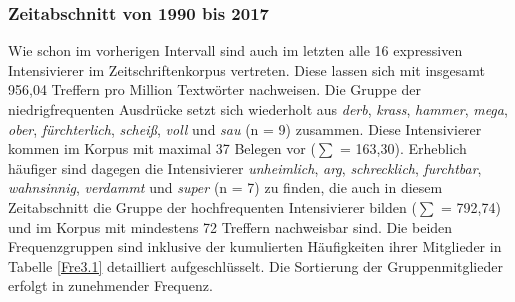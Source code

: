 \subsubsection{Zeitabschnitt von 1990 bis 2017} \label{abs:Freqgruppe}
Wie schon im vorherigen Intervall sind auch im letzten alle 16 expressiven Intensivierer im Zeitschriftenkorpus vertreten. Diese lassen sich mit insgesamt 956,04 Treffern pro Million Textwörter nachweisen. Die Gruppe der niedrigfrequenten Ausdrücke setzt sich wiederholt aus \textit{derb}, \textit{krass}, \textit{hammer}, \textit{mega}, \textit{ober}, \textit{fürchterlich}, \textit{scheiß}, \textit{voll} und \textit{sau} (n = 9) zusammen. Diese Intensivierer kommen im Korpus mit maximal 37 Belegen vor (${\scriptstyle \sum{}}$ = 163,30). Erheblich häufiger sind dagegen die Intensivierer \textit{unheimlich}, \textit{arg}, \textit{schrecklich}, \textit{furchtbar}, \textit{wahnsinnig}, \textit{verdammt} und \textit{super} (n = 7) zu finden, die auch in diesem Zeitabschnitt die Gruppe der hochfrequenten Intensivierer bilden (${\scriptstyle \sum{}}$ = 792,74) und im Korpus mit mindestens 72 Treffern nachweisbar sind. Die beiden Frequenzgruppen sind inklusive der kumulierten Häufigkeiten ihrer Mitglieder in Tabelle \ref{Fre3.1} detailliert aufgeschlüsselt. Die Sortierung der Gruppenmitglieder erfolgt in zunehmender Frequenz.


